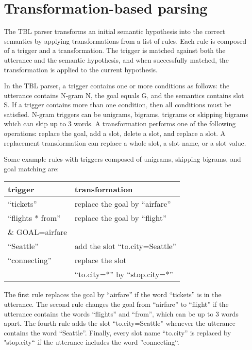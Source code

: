 \documentclass{article}
\begin{document}
\section{Transformation-based parsing} \label{sec:tbl}

The TBL parser transforms an initial semantic hypothesis into the correct semantics by applying transformations from a list of rules. Each rule is composed of a trigger and a transformation. The trigger is matched against both the utterance and the semantic hypothesis, and when successfully matched, the transformation is applied to the current hypothesis. 

In the TBL parser, a trigger contains one or more conditions as follows: the utterance contains N-gram N, the goal equals G, and the semantics contains slot S. If a trigger contains more than one condition, then all conditions must be satisfied. N-gram triggers can be unigrams, bigrams, trigrams or skipping bigrams
which can skip up to 3 words.
A transformation performs one of the following operations: replace the goal, add a slot, delete a slot, and replace a slot. A replacement transformation can replace a whole slot, a slot name, 
or a slot value. 

Some example rules with triggers composed of unigrams, skipping bigrams, and goal matching are:

\vspace{.15cm}
\begin{tabular}{ll}
  trigger & transformation \\
  \hline 
  ``tickets''        & replace the goal by ``airfare''\\
  ``flights * from'' & replace the goal by ``flight'' \\
  \& GOAL=airfare    & \\
  ``Seattle''        & add the slot ``to.city=Seattle'' \\
  ``connecting''     & replace the slot \\
                     & ``to.city=*'' by ``stop.city=*'' \\
\end{tabular} 
\vspace{.15cm}

The first rule replaces the goal by ``airfare'' if the word ``tickets'' is in the utterance. The second rule changes the goal from ``airfare'' to ``flight'' if the utterance contains the words ``flights'' and ``from'', which can be up to 3 words apart. The fourth rule adds the slot ``to.city=Seattle'' whenever the utterance contains the word ``Seattle''. Finally, every slot name ``to.city'' is replaced by "stop.city`` if the utterance includes the word ''connecting``.
\end{document}
